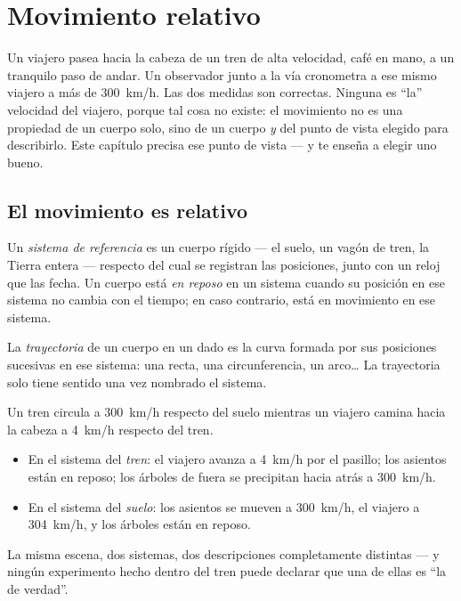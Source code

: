 \chapter{Movimiento relativo}\label{ch:g10:relative-motion}

Un viajero pasea hacia la cabeza de un tren de alta velocidad, café en
mano, a un tranquilo paso de andar. Un observador junto a la vía cronometra
a ese mismo viajero a más de \qty{300}{km/h}. Las dos medidas son
correctas. Ninguna es ``la'' velocidad del viajero, porque tal cosa no
existe: el movimiento no es una propiedad de un cuerpo solo, sino de un
cuerpo \emph{y} del punto de vista elegido para describirlo. Este
capítulo precisa ese punto de vista --- y te enseña a elegir uno bueno.

\section{El movimiento es relativo}

\begin{definition}\label{def:g10:relative-motion:frame}
Un \emph{sistema de referencia} es un
cuerpo rígido --- el suelo, un vagón de tren, la Tierra entera ---
respecto del cual se registran las posiciones, junto con un reloj que
las fecha. Un cuerpo está \emph{en reposo} en un sistema
cuando su posición en ese sistema no cambia con el tiempo; en caso
contrario, está en movimiento en ese sistema.
\end{definition}

\begin{definition}[Trayectoria]\label{def:g10:relative-motion:trajectory}
La \emph{trayectoria} de un cuerpo en un  dado es la curva formada por sus posiciones sucesivas en ese
sistema: una recta, una circunferencia, un arco\dots{} La trayectoria
solo tiene sentido una vez nombrado el sistema.
\end{definition}

\begin{example}\label{ex:g10:relative-motion:walker}
Un tren circula a \qty{300}{km/h} respecto del suelo mientras un viajero
camina hacia la cabeza a \qty{4}{km/h} respecto del tren.
\begin{itemize}
  \item En el sistema del \emph{tren}: el viajero avanza a \qty{4}{km/h}
        por el pasillo; los asientos están en reposo; los árboles de
        fuera se precipitan hacia atrás a \qty{300}{km/h}.
  \item En el sistema del \emph{suelo}: los asientos se mueven a
        \qty{300}{km/h}, el viajero a \qty{304}{km/h}, y los árboles
        están en reposo.
\end{itemize}
La misma escena, dos sistemas, dos descripciones completamente distintas
--- y ningún experimento hecho dentro del tren puede declarar que una de
ellas es ``la de verdad''.
\end{example}

